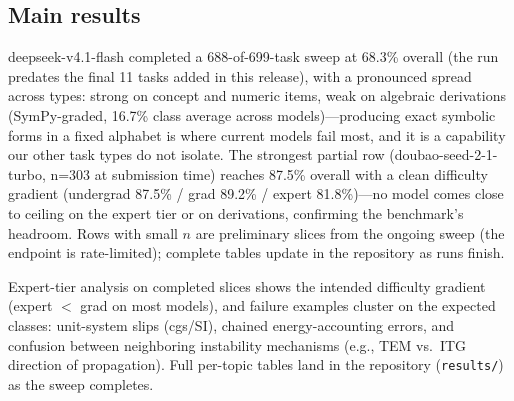 \subsection{Main results}


deepseek-v4.1-flash completed a 688-of-699-task sweep at 68.3\% overall (the run predates the final 11 tasks added in this release), with a pronounced spread across types: strong on concept and numeric items, weak on algebraic derivations (SymPy-graded, 16.7\% class average across models)---producing exact symbolic forms in a fixed alphabet is where current models fail most, and it is a capability our other task types do not isolate. The strongest partial row (doubao-seed-2-1-turbo, n=303 at submission time) reaches 87.5\% overall with a clean difficulty gradient (undergrad 87.5\% / grad 89.2\% / expert 81.8\%)---no model comes close to ceiling on the expert tier or on derivations, confirming the benchmark's headroom. Rows with small $n$ are preliminary slices from the ongoing sweep (the endpoint is rate-limited); complete tables update in the repository as runs finish.

Expert-tier analysis on completed slices shows the intended difficulty gradient (expert $<$ grad on most models), and failure examples cluster on the expected classes: unit-system slips (cgs/SI), chained energy-accounting errors, and confusion between neighboring instability mechanisms (e.g., TEM vs.\ ITG direction of propagation). Full per-topic tables land in the repository (\texttt{results/}) as the sweep completes.
